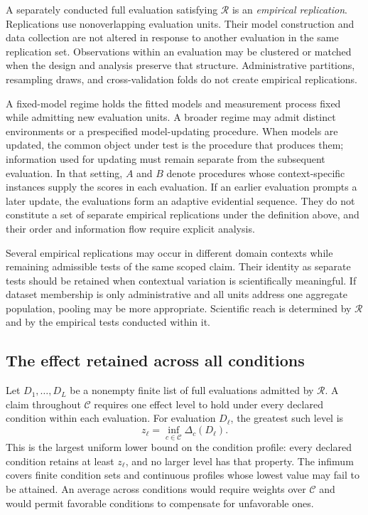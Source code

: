 \documentclass[11pt]{article}
\newcommand{\Regime}{\mathcal{R}}
\newcommand{\CSet}{\mathcal{C}}
\theoremstyle{remark}
\begin{document}
A separately conducted full evaluation satisfying $\Regime$ is an \emph{empirical replication}. Replications use nonoverlapping evaluation units. Their model construction and data collection are not altered in response to another evaluation in the same replication set. Observations within an evaluation may be clustered or matched when the design and analysis preserve that structure. Administrative partitions, resampling draws, and cross-validation folds do not create empirical replications.

A fixed-model regime holds the fitted models and measurement process fixed while admitting new evaluation units. A broader regime may admit distinct environments or a prespecified model-updating procedure. When models are updated, the common object under test is the procedure that produces them; information used for updating must remain separate from the subsequent evaluation. In that setting, $A$ and $B$ denote procedures whose context-specific instances supply the scores in each evaluation. If an earlier evaluation prompts a later update, the evaluations form an adaptive evidential sequence. They do not constitute a set of separate empirical replications under the definition above, and their order and information flow require explicit analysis.

Several empirical replications may occur in different domain contexts while remaining admissible tests of the same scoped claim. Their identity as separate tests should be retained when contextual variation is scientifically meaningful. If dataset membership is only administrative and all units address one aggregate population, pooling may be more appropriate. Scientific reach is determined by $\Regime$ and by the empirical tests conducted within it.

\subsection{The effect retained across all conditions}

Let $D_1,\ldots,D_L$ be a nonempty finite list of full evaluations admitted by $\Regime$. A claim throughout $\CSet$ requires one effect level to hold under every declared condition within each evaluation. For evaluation $D_\ell$, the greatest such level is
\begin{equation}
z_\ell
=
\inf_{c\in\CSet}\Delta_c(D_\ell).
\label{eq:evaluation-retained-effect}
\end{equation}
This is the largest uniform lower bound on the condition profile: every declared condition retains at least $z_\ell$, and no larger level has that property. The infimum covers finite condition sets and continuous profiles whose lowest value may fail to be attained. An average across conditions would require weights over $\CSet$ and would permit favorable conditions to compensate for unfavorable ones.
\end{document}
